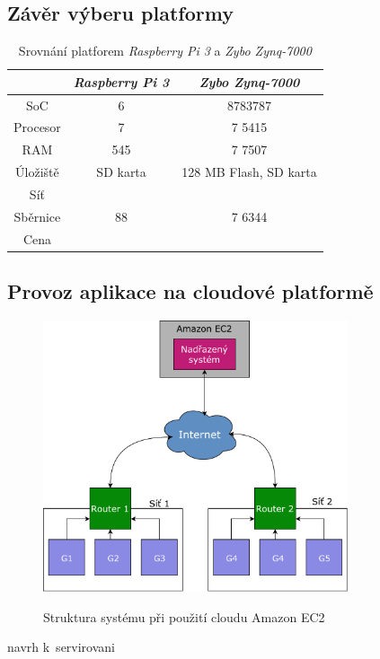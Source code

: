 \subsection{Závěr výberu platformy}

\begin{table}[h!]
\centering
\begin{tabular}{|c | c | c |} 
 \hline
 & \textit{Raspberry Pi 3} & \textit{Zybo Zynq-7000} \\
 \hline 
 SoC & 6 & 8783787 \\ 
 Procesor & 7 & 7 5415 \\
 RAM & 545 & 7 7507 \\
 Úložiště & SD karta & 128 MB Flash, SD karta \\
 Síť & & \\
 Sběrnice & 88 & 7 6344 \\
 Cena & & \\
 \hline
\end{tabular}
\caption{Srovnání platforem \textit{Raspberry Pi 3} a \textit{Zybo Zynq-7000}}
\label{tab:plat_compare}
\end{table}

\subsection{Provoz aplikace na cloudové platformě}
\label{sec:an_cloud}

\begin{figure}[h!]
    \centering
    \includegraphics[width=0.8\textwidth]{images/aws.pdf}
    \label{fig:aws}
    \caption{Struktura systému při použití cloudu Amazon EC2}
\end{figure}

navrh k~servirovani